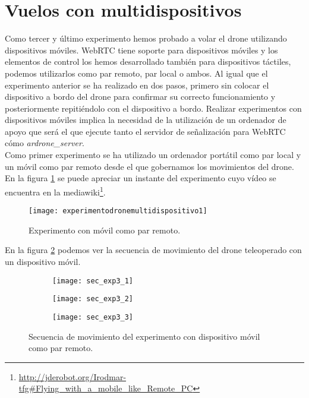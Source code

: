 \section{Vuelos con multidispositivos}

Como tercer y último experimento hemos probado a volar el drone utilizando dispositivos móviles. WebRTC tiene soporte para dispositivos móviles y los elementos de control los hemos desarrollado también para dispositivos táctiles, podemos utilizarlos como par remoto, par local o ambos. Al igual que el experimento anterior se ha realizado en dos pasos, primero sin colocar el dispositivo a bordo del drone para confirmar su correcto funcionamiento y posteriormente repitiéndolo con el dispositivo a bordo. Realizar experimentos con dispositivos móviles implica la necesidad de la utilización de un ordenador de apoyo que será el que ejecute tanto el servidor de señalización para WebRTC cómo \emph{ardrone\_server}.\\

Como primer experimento se ha utilizado un ordenador portátil como par local y un móvil como par remoto desde el que gobernamos los movimientos del drone. En la figura \ref{fig:experimentodronemultidispositivo1} se puede apreciar un instante del experimento cuyo vídeo se encuentra en la mediawiki\footnote{\url{http://jderobot.org/Irodmar-tfg\#Flying\_with\_a\_mobile\_like\_Remote\_PC}}.\\

\begin{figure}[h!]
\centering
\texttt{[image: experimentodronemultidispositivo1]}
\caption{Experimento con móvil como par remoto.}
\label{fig:experimentodronemultidispositivo1}
\end{figure}

En la figura \ref{fig:secexp3} podemos ver la secuencia de movimiento del drone teleoperado con un dispositivo móvil.\\

\begin{figure}[h!]
\centering
  \begin{subfigure}[]{48mm}
    \texttt{[image: sec\_exp3\_1]}
  \end{subfigure}
  \hspace{1pt}
  \begin{subfigure}[]{48mm}
    \texttt{[image: sec\_exp3\_2]}
  \end{subfigure}
    \hspace{1pt}
    \begin{subfigure}[]{48mm}
    \texttt{[image: sec\_exp3\_3]}
  \end{subfigure}
    \caption{Secuencia de movimiento del experimento con dispositivo móvil como par remoto.}
  \label{fig:secexp3}
\end{figure}


